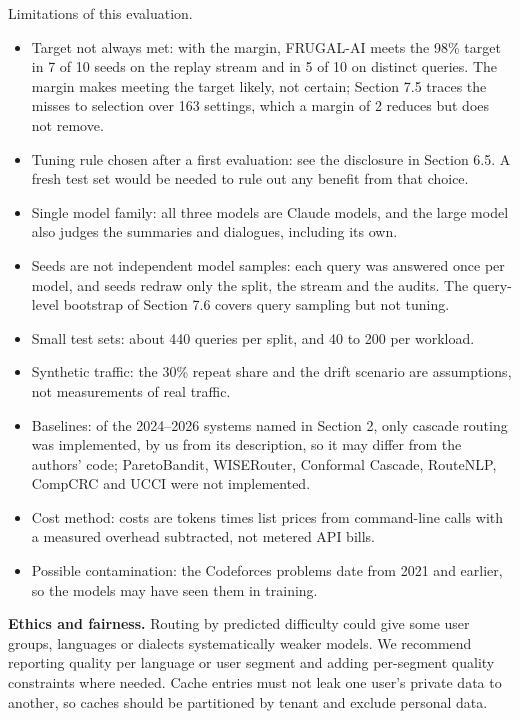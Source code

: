\documentclass[
  10pt,
]{article}
\providecommand{\tightlist}{%
  \setlength{\itemsep}{0pt}\setlength{\parskip}{0pt}}
\begin{document}
Limitations of this evaluation.

\begin{itemize}
\tightlist
\item
  Target not always met: with the margin, FRUGAL-AI meets the 98\%
  target in 7 of 10 seeds on the replay stream and in 5 of 10 on
  distinct queries. The margin makes meeting the target likely, not
  certain; Section 7.5 traces the misses to selection over 163 settings,
  which a margin of 2 reduces but does not remove.
\item
  Tuning rule chosen after a first evaluation: see the disclosure in
  Section 6.5. A fresh test set would be needed to rule out any benefit
  from that choice.
\item
  Single model family: all three models are Claude models, and the large
  model also judges the summaries and dialogues, including its own.
\item
  Seeds are not independent model samples: each query was answered once
  per model, and seeds redraw only the split, the stream and the audits.
  The query-level bootstrap of Section 7.6 covers query sampling but not
  tuning.
\item
  Small test sets: about 440 queries per split, and 40 to 200 per
  workload.
\item
  Synthetic traffic: the 30\% repeat share and the drift scenario are
  assumptions, not measurements of real traffic.
\item
  Baselines: of the 2024--2026 systems named in Section 2, only cascade
  routing was implemented, by us from its description, so it may differ
  from the authors' code; ParetoBandit, WISERouter, Conformal Cascade,
  RouteNLP, CompCRC and UCCI were not implemented.
\item
  Cost method: costs are tokens times list prices from command-line
  calls with a measured overhead subtracted, not metered API bills.
\item
  Possible contamination: the Codeforces problems date from 2021 and
  earlier, so the models may have seen them in training.
\end{itemize}

\textbf{Ethics and fairness.} Routing by predicted difficulty could give
some user groups, languages or dialects systematically weaker models. We
recommend reporting quality per language or user segment and adding
per-segment quality constraints where needed. Cache entries must not
leak one user's private data to another, so caches should be partitioned
by tenant and exclude personal data.
\end{document}
